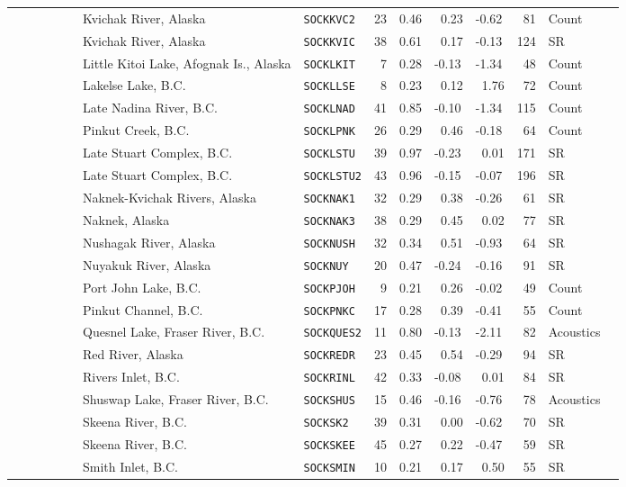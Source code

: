 \begin{flushleft}
\begin{tabular*}{7.1in}{llllllllll}
&~~~~~~~~~Kvichak River, Alaska&{\tt SOCKKVC2}&23&0.46&~0.23&-0.62&~81&Count  & \\ 
&~~~~~~~~~Kvichak River, Alaska&{\tt SOCKKVIC}&38&0.61&~0.17&-0.13&124&SR  & \\ 
&~~~~~~~~~Little Kitoi Lake, Afognak Is., Alaska&{\tt SOCKLKIT}&~7&0.28&-0.13&-1.34&~48&Count  & \\ 
&~~~~~~~~~Lakelse Lake, B.C.&{\tt SOCKLLSE}&~8&0.23&~0.12&~1.76&~72&Count  & \\ 
&~~~~~~~~~Late Nadina River, B.C.&{\tt SOCKLNAD}&41&0.85&-0.10&-1.34&115&Count  & \\ 
&~~~~~~~~~Pinkut Creek, B.C.&{\tt SOCKLPNK}&26&0.29&~0.46&-0.18&~64&Count  & \\ 
&~~~~~~~~~Late Stuart Complex, B.C.&{\tt SOCKLSTU}&39&0.97&-0.23&~0.01&171&SR  & \\ 
&~~~~~~~~~Late Stuart Complex, B.C.&{\tt SOCKLSTU2}&43&0.96&-0.15&-0.07&196&SR  & \\ 
&~~~~~~~~~Naknek-Kvichak Rivers, Alaska&{\tt SOCKNAK1}&32&0.29&~0.38&-0.26&~61&SR  & \\ 
&~~~~~~~~~Naknek, Alaska&{\tt SOCKNAK3}&38&0.29&~0.45&~0.02&~77&SR  & \\ 
&~~~~~~~~~Nushagak River, Alaska&{\tt SOCKNUSH}&32&0.34&~0.51&-0.93&~64&SR  & \\ 
&~~~~~~~~~Nuyakuk River, Alaska&{\tt SOCKNUY}&20&0.47&-0.24&-0.16&~91&SR  & \\ 
&~~~~~~~~~Port John Lake, B.C.&{\tt SOCKPJOH}&~9&0.21&~0.26&-0.02&~49&Count  & \\ 
&~~~~~~~~~Pinkut Channel, B.C.&{\tt SOCKPNKC}&17&0.28&~0.39&-0.41&~55&Count  & \\ 
&~~~~~~~~~Quesnel Lake, Fraser River, B.C.&{\tt SOCKQUES2}&11&0.80&-0.13&-2.11&~82&Acoustics  & \\ 
&~~~~~~~~~Red River, Alaska&{\tt SOCKREDR}&23&0.45&~0.54&-0.29&~94&SR  & \\ 
&~~~~~~~~~Rivers Inlet, B.C.&{\tt SOCKRINL}&42&0.33&-0.08&~0.01&~84&SR  & \\ 
&~~~~~~~~~Shuswap Lake, Fraser River, B.C.&{\tt SOCKSHUS}&15&0.46&-0.16&-0.76&~78&Acoustics  & \\ 
&~~~~~~~~~Skeena River, B.C.&{\tt SOCKSK2}&39&0.31&~0.00&-0.62&~70&SR  & \\ 
&~~~~~~~~~Skeena River, B.C.&{\tt SOCKSKEE}&45&0.27&~0.22&-0.47&~59&SR  & \\ 
&~~~~~~~~~Smith Inlet, B.C.&{\tt SOCKSMIN}&10&0.21&~0.17&~0.50&~55&SR  & \\ 

\end{tabular*}
\end{flushleft}
